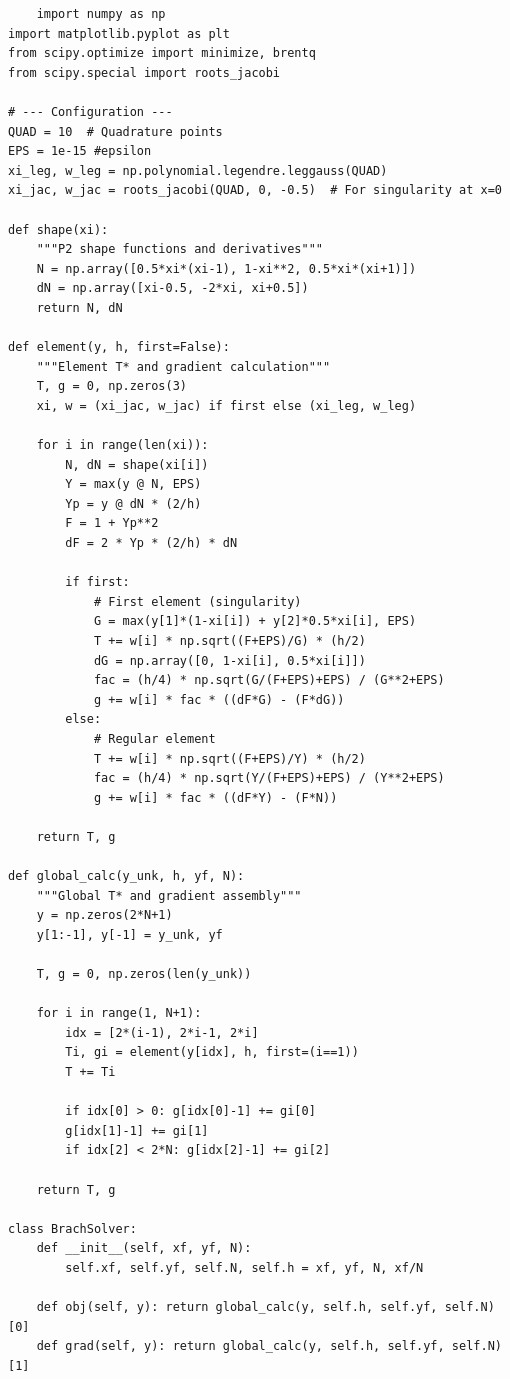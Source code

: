 \documentclass[11pt]{article}
\begin{document}
\begin{verbatim}
    import numpy as np
import matplotlib.pyplot as plt
from scipy.optimize import minimize, brentq
from scipy.special import roots_jacobi

# --- Configuration ---
QUAD = 10  # Quadrature points
EPS = 1e-15 #epsilon
xi_leg, w_leg = np.polynomial.legendre.leggauss(QUAD)
xi_jac, w_jac = roots_jacobi(QUAD, 0, -0.5)  # For singularity at x=0

def shape(xi):
    """P2 shape functions and derivatives"""
    N = np.array([0.5*xi*(xi-1), 1-xi**2, 0.5*xi*(xi+1)])
    dN = np.array([xi-0.5, -2*xi, xi+0.5])
    return N, dN

def element(y, h, first=False):
    """Element T* and gradient calculation"""
    T, g = 0, np.zeros(3)
    xi, w = (xi_jac, w_jac) if first else (xi_leg, w_leg)

    for i in range(len(xi)):
        N, dN = shape(xi[i])
        Y = max(y @ N, EPS)
        Yp = y @ dN * (2/h)
        F = 1 + Yp**2
        dF = 2 * Yp * (2/h) * dN

        if first:
            # First element (singularity)
            G = max(y[1]*(1-xi[i]) + y[2]*0.5*xi[i], EPS)
            T += w[i] * np.sqrt((F+EPS)/G) * (h/2)
            dG = np.array([0, 1-xi[i], 0.5*xi[i]])
            fac = (h/4) * np.sqrt(G/(F+EPS)+EPS) / (G**2+EPS)
            g += w[i] * fac * ((dF*G) - (F*dG))
        else:
            # Regular element
            T += w[i] * np.sqrt((F+EPS)/Y) * (h/2)
            fac = (h/4) * np.sqrt(Y/(F+EPS)+EPS) / (Y**2+EPS)
            g += w[i] * fac * ((dF*Y) - (F*N))

    return T, g

def global_calc(y_unk, h, yf, N):
    """Global T* and gradient assembly"""
    y = np.zeros(2*N+1)
    y[1:-1], y[-1] = y_unk, yf

    T, g = 0, np.zeros(len(y_unk))

    for i in range(1, N+1):
        idx = [2*(i-1), 2*i-1, 2*i]
        Ti, gi = element(y[idx], h, first=(i==1))
        T += Ti

        if idx[0] > 0: g[idx[0]-1] += gi[0]
        g[idx[1]-1] += gi[1]
        if idx[2] < 2*N: g[idx[2]-1] += gi[2]

    return T, g

class BrachSolver:
    def __init__(self, xf, yf, N):
        self.xf, self.yf, self.N, self.h = xf, yf, N, xf/N

    def obj(self, y): return global_calc(y, self.h, self.yf, self.N)[0]
    def grad(self, y): return global_calc(y, self.h, self.yf, self.N)[1]


\end{verbatim}
\end{document}
